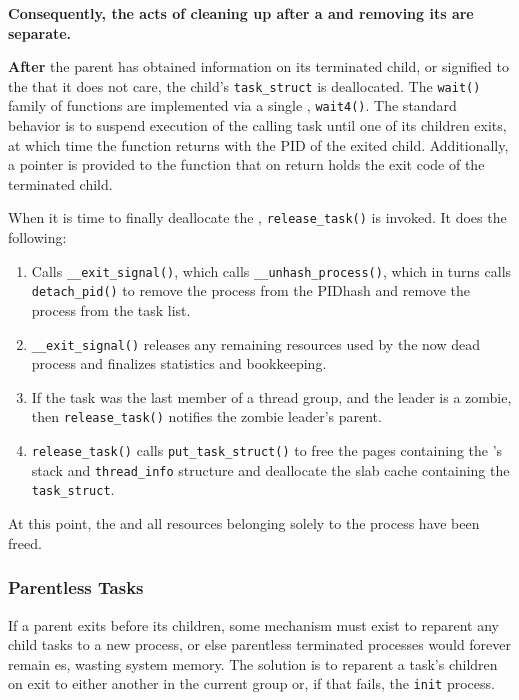 \begin{center}
  \large{\textbf{Consequently, the acts of cleaning up after a  and removing its  are separate.}}
\end{center}

\textbf{After} the parent has obtained information on its terminated child, or signified to the  that it does not care, the child’s \texttt{task_struct} is deallocated.
The \texttt{wait()} family of functions are implemented via a single , \texttt{wait4()}.
The standard behavior is to suspend execution of the calling task until one of its children exits, at which time the function returns with the PID of the exited child.
Additionally, a pointer is provided to the function that on return holds the exit code of the terminated child.

When it is time to finally deallocate the , \texttt{release_task()} is invoked.
It does the following:
\begin{enumerate}
\item Calls \texttt{__exit_signal()}, which calls \texttt{__unhash_process()}, which in turns calls \texttt{detach_pid()} to remove the process from the PIDhash and remove the process from the task list.
\item \texttt{__exit_signal()} releases any remaining resources used by the now dead process and finalizes statistics and bookkeeping.
\item If the task was the last member of a thread group, and the leader is a zombie, then \texttt{release_task()} notifies the zombie leader’s parent.
\item \texttt{release_task()} calls \texttt{put_task_struct()} to free the pages containing the ’s  stack and \texttt{thread_info} structure and deallocate the slab cache containing the \texttt{task_struct}.
\end{enumerate}

At this point, the  and all resources belonging solely to the process
have been freed.

\subsubsection{Parentless Tasks}\label{subsubsec:Parentless_Tasks}
If a parent exits before its children, some mechanism must exist to reparent any child tasks to a new process, or else parentless terminated processes would forever remain es, wasting system memory.
The solution is to reparent a task’s children on exit to either another  in the current  group or, if that fails, the \texttt{init} process.

